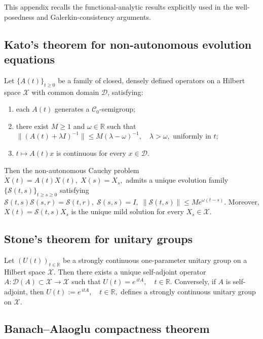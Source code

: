\documentclass[AMA,Times2COL]{WileyNJDv5}
\begin{document}
This appendix recalls the functional-analytic results explicitly used in the well-posedness and Galerkin-consistency arguments.

\subsection{Kato's theorem for non-autonomous evolution equations}

\begin{theorem}
\label{thm:Kato}
Let $\{A(t)\}_{t\ge0}$ be a family of closed, densely defined operators on a Hilbert space $\mathscr{X}$ with common domain $\mathcal D$, satisfying:
\begin{enumerate}
\item[(i)] each $A(t)$ generates a $\mathcal C_0$-semigroup;
\item[(ii)] there exist $M\ge1$ and $\omega\in\mathbb R$ such that
\(
\|(A(t)+\lambda I)^{-1}\|
\le
M(\lambda-\omega)^{-1},
\quad \lambda>\omega,
\)
uniformly in $t$;
\item[(iii)] $t\mapsto A(t)x$ is continuous for every $x\in\mathcal D$.
\end{enumerate}
Then the non-autonomous Cauchy problem
\(
\dot X(t)=A(t)X(t), \; X(s)=X_s,
\)
 admits a unique evolution family
$\{\mathcal S(t,s)\}_{t\ge s\ge0}$ satisfying
\(
\mathcal S(t,s)\mathcal S(s,r)=\mathcal S(t,r),
\;
\mathcal S(s,s)=I,
\;
\|\mathcal S(t,s)\|\le Me^{\omega(t-s)} .
\)
Moreover, $X(t)=\mathcal S(t,s)X_s$ is the unique mild solution for every
$X_s\in\mathscr X$.
\end{theorem}

\subsection{Stone's theorem for unitary groups}

\begin{theorem}
\label{thm:stone}
Let $(U(t))_{t\in\mathbb{R}}$ be a strongly continuous one-parameter unitary
group on a Hilbert space $\mathscr{X}$. Then there exists a unique self-adjoint operator $A:\mathcal{D}(A)\subset\mathscr{X}\to\mathscr{X}$ such that
\(
U(t)=e^{\,itA},
\quad t\in\mathbb{R}.
\)
Conversely, if $A$ is self-adjoint, then
\(
U(t):=e^{\,itA},
\quad t\in\mathbb{R},
\)
defines a strongly continuous unitary group on $\mathscr{X}$.
\end{theorem}

\subsection{Banach--Alaoglu compactness theorem}
\end{document}
